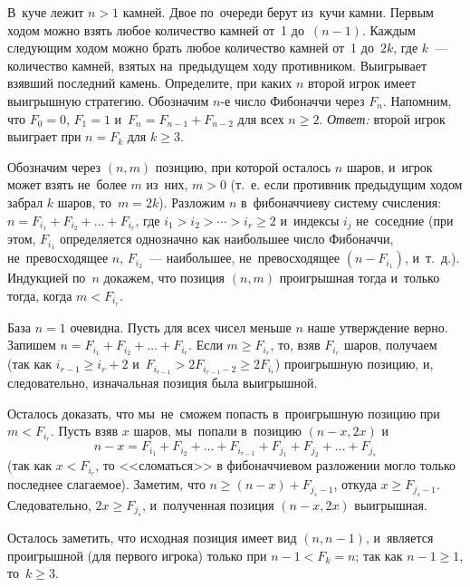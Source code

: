 \problem{}
В~куче лежит $n > 1$ камней.
Двое по~очереди берут из~кучи камни.
Первым ходом можно взять любое количество камней от~1 до~$(n - 1)$.
Каждым следующим ходом можно брать любое количество камней от~1 до~$2 k$, где
$k$~--- количество камней, взятых на~предыдущем ходу противником.
Выигрывает взявший последний камень.
Определите, при каких $n$ второй игрок имеет выигрышную стратегию.
\solution
Обозначим $n$-е число Фибоначчи через $F_n$.
Напомним, что $F_0 = 0$, $F_1 = 1$ и~$F_n = F_{n-1} + F_{n-2}$ для всех
$n \geq 2$.
\emph{Ответ:} второй игрок выиграет при $n = F_k$ для $k \geq 3$.
\par
Обозначим через $(n, m)$ позицию, при которой осталось $n$ шаров, и~игрок может
взять не~более $m$ из~них, $m > 0$
(т.~е. если противник предыдущим ходом забрал $k$ шаров, то~$m = 2 k$).
Разложим $n$ в~фибоначчиеву систему счисления:
$n = F_{i_1} + F_{i_2} + \ldots + F_{i_r}$,
где $i_1 > i_2 > \cdots > i_r \geq 2$ и~индексы $i_j$ не~соседние
(при этом, $F_{i_1}$ определяется однозначно как наибольшее число Фибоначчи,
не~превосходящее $n$, $F_{i_2}$~--- наибольшее, не~превосходящее
$(n - F_{i_1})$, и~т.~д.).
Индукцией по~$n$ докажем, что позиция $(n, m)$ проигрышная тогда и~только
тогда, когда $m < F_{i_r}$.
\par
База $n = 1$ очевидна.
Пусть для всех чисел меньше $n$ наше утверждение верно.
Запишем $n = F_{i_1} + F_{i_2} + \ldots + F_{i_r}$.
Если $m \geq F_{i_r}$, то, взяв $F_{i_r}$ шаров, получаем
(так как $i_{r-1} \geq i_r + 2$
и~$F_{i_{r-1}} > 2 F_{i_{r-1}-2} \geq 2 F_{i_r}$)
проигрышную позицию, и, следовательно, изначальная позиция была выигрышной.
\par
Осталось доказать, что мы~не~сможем попасть в~проигрышную позицию при
$m < F_{i_r}$.
Пусть взяв $x$ шаров, мы~попали в~позицию $(n - x, 2 x)$ и
\[
    n - x
=
    F_{i_1} + F_{i_2} + \ldots + F_{i_{r-1}} +
    F_{j_1} + F_{j_2} + \ldots + F_{j_s}
\]
(так как $x < F_{i_r}$, то <<сломаться>> в фибоначчиевом разложении могло
только последнее слагаемое).
Заметим, что $n \geq (n - x) + F_{j_s-1}$, откуда $x \geq F_{j_s-1}$.
Следовательно, $2 x \geq F_{j_s}$, и~полученная позиция $(n - x, 2 x)$
выигрышная.
\par
Осталось заметить, что исходная позиция имеет вид $(n, n-1)$, и~является
проигрышной (для первого игрока) только при $n - 1 < F_k = n$;
так как $n - 1 \geq 1$, то~$k \geq 3$.
\endproblem
